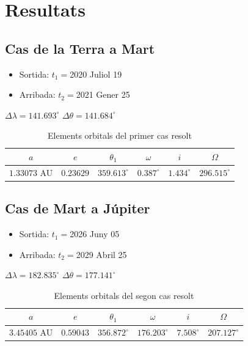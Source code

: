 \chapter{Resultats}

\section{Cas de la Terra a Mart}
\begin{itemize}
	\item Sortida: $t_{1}=$2020 Juliol 19
	\item Arribada: $t_{2}=$2021 Gener 25
\end{itemize}
$\Delta\lambda=141.693^{\circ}$
$\Delta\theta=141.684^{\circ}$
\begin{table}[h!]
	\centering
	\begin{tabular}{ |c|c|c|c|c|c|}
		\hline
		$a$ & $e$ & $\theta_{1}$ & $\omega$ & $i$ & $\Omega$ \\ \hline
		$1.33073$ AU  & $0.23629$ & $359.613^{\circ}$ & $0.387^{\circ}$ & $1.434^{\circ}$ & $296.515^{\circ}$ \\ \hline
	\end{tabular}
	\caption{Elements orbitals del primer cas resolt}
\end{table}

\section{Cas de Mart a Júpiter}
\begin{itemize}
	\item Sortida: $t_{1}=$2026 Juny 05
	\item Arribada: $t_{2}=$2029 Abril 25
\end{itemize}
$\Delta\lambda=182.835^{\circ}$
$\Delta\theta=177.141^{\circ}$
\begin{table}[h!]
	\centering
	\begin{tabular}{ |c|c|c|c|c|c|}
		\hline
		$a$ & $e$ & $\theta_{1}$ & $\omega$ & $i$ & $\Omega$ \\ \hline
		$3.45405$ AU  & $0.59043$ & $356.872^{\circ}$ & $176.203^{\circ}$ & $7.508^{\circ}$ & $207.127^{\circ}$ \\ \hline
	\end{tabular}
	\caption{Elements orbitals del segon cas resolt}
\end{table}

